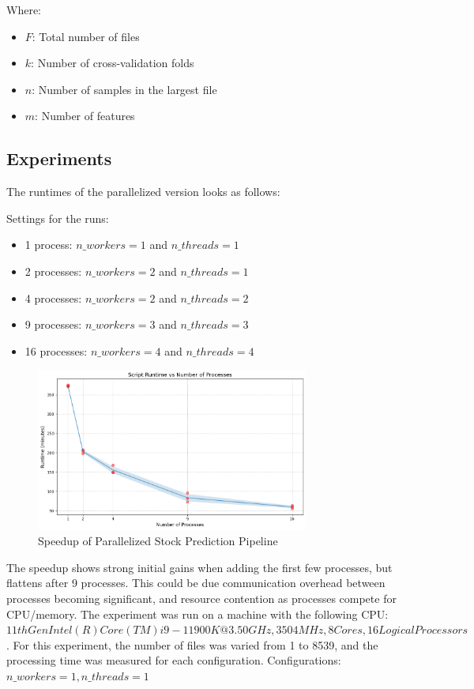 \documentclass[11pt,a4paper]{article}
\begin{document}
Where:
\begin{itemize}
    \item $F$: Total number of files
    \item $k$: Number of cross-validation folds
    \item $n$: Number of samples in the largest file
    \item $m$: Number of features
\end{itemize}

\subsection{Experiments}
The runtimes of the parallelized version looks as follows:

Settings for the runs:
\begin{itemize}
    \item 1 process: $n\_workers = 1$ and $n\_threads = 1$
    \item 2 processes: $n\_workers = 2$ and $n\_threads = 1$
    \item 4 processes: $n\_workers = 2$ and $n\_threads = 2$
    \item 9 processes: $n\_workers = 3$ and $n\_threads = 3$
    \item 16 processes: $n\_workers = 4$ and $n\_threads = 4$
    
\end{itemize}

\begin{figure}[H]
    \centering
    \includegraphics[width=0.8\textwidth]{runtime.png}
    \caption{Speedup of Parallelized Stock Prediction Pipeline}
\end{figure}

The speedup shows strong initial gains when adding the first few processes, but flattens after 9 processes. This could be due communication overhead between processes becoming significant, and resource contention as processes compete for CPU/memory.
The experiment was run on a machine with the following CPU:\newline
$11th Gen Intel(R) Core(TM) i9-11900K @ 3.50GHz, 3504 MHz, 8 Cores, 16 Logical Processors$.
\newline \newline
For this experiment, the number of files was varied from 1 to 8539, and the processing time was measured for each configuration.
Configurations: $n\_workers = 1, n\_threads = 1$
\end{document}
